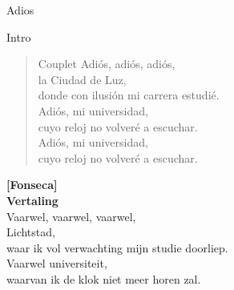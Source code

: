 \begin{song}{Adios}

\begin{instrumental}{Intro}

 \measure{} \measure{} \measure{}  \measure{}   %
\end{instrumental}


\begin{verse}{Couplet}
Adiós, adiós, adiós,\\
\chord{}la Ciudad de Luz,\\
donde con ilusión mi carrera estudié.\\
Adiós, mi universidad,\\
cuyo reloj no volveré a escuchar.\\
Adiós, mi universidad,\\
cuyo reloj no volveré a escuchar.\\
\end{verse}

\textbf{[Fonseca]}\\
\vspace{10em}
\textbf{Vertaling}\\
Vaarwel, vaarwel, vaarwel,\\
Lichtstad,\\
waar ik vol verwachting mijn studie doorliep.\\
Vaarwel universiteit,\\
waarvan ik de klok niet meer horen zal.\\
\end{song}